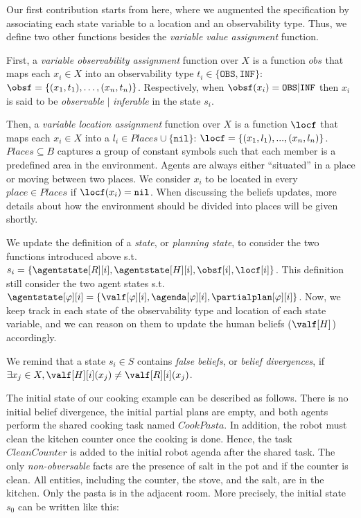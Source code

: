 Our first contribution starts from here, where we augmented the specification by associating each state variable to a location and an observability type. Thus, we define two other functions besides the \textit{variable value assignment} function.

First, a \textit{variable observability assignment} function over $X$ is a function $obs$ that maps each $x_i \in X$ into an observability type $t_i \in \{ \texttt{OBS},  \texttt{INF} \}$: $\obsf = \{ (x_1,t_1), \ldots , (x_n,t_n) \}$. Respectively, when $\obsf(x_i) = \texttt{OBS} | \texttt{INF}$ then $x_i$ is said to be \textit{observable} $|$ \textit{inferable} in the state $s_i$.

Then, a \textit{variable location assignment} function over $X$ is a function $\locf$ that maps each $x_i \in X$ into a $l_i \in Places \cup \{ \texttt{nil} \}$: $\locf = \{ (x_1,l_1), ..., (x_n,l_n) \}$. 
$Places \subseteq B$ captures a group of constant symbols such that each member is a predefined area in the environment. 
Agents are always either ``situated'' in a place or moving between two places. 
We consider $x_i$ to be located in every $place \in Places$ if $\locf(x_i)=\texttt{nil}$. 
When discussing the beliefs updates, more details about how the environment should be divided into places will be given shortly.

We update the definition of a \textit{state}, or \textit{planning state}, to consider the two functions introduced above s.t. $s_i = \{ \agentstate[R][i], \agentstate[H][i], \obsf[i], \locf[i] \}$. This definition still consider the two agent states s.t. $\agentstate[\varphi][i] = \{ \valf[\varphi][i], \agenda[\varphi][i], \partialplan[\varphi][i] \}$. Now, we keep track in each state of the observability type and location of each state variable, and we can reason on them to update the human beliefs ($\valf[H]$) accordingly. 

We remind that a state $s_i \in S$ contains \textit{false beliefs}, or \textit{belief divergences}, if $\exists x_j \in X, \valf[H][i](x_j) \neq \valf[R][i](x_j)$. 

The initial state of our cooking example can be described as follows. There is no initial belief divergence, the initial partial plans are empty, and both agents perform the shared cooking task named $CookPasta$. In addition, the robot must clean the kitchen counter once the cooking is done. Hence, the task $CleanCounter$ is added to the initial robot agenda after the shared task. The only \textit{non-obversable} facts are the presence of salt in the pot and if the counter is clean. All entities, including the counter, the stove, and the salt, are in the kitchen. Only the pasta is in the adjacent room. More precisely, the initial state $s_0$ can be written like this: 

